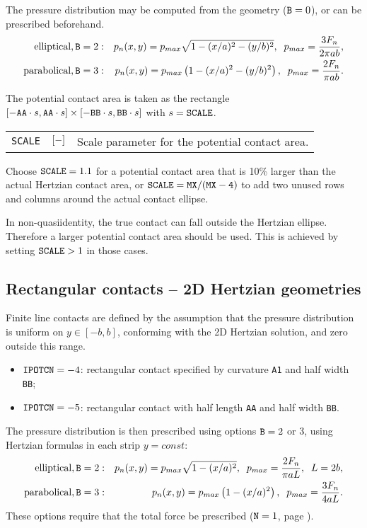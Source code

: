\documentclass[12pt]{report}
\newenvironment{inputvars}{\vspace{0.4\baselineskip}%

\begin{tabular}{>{\raggedright}p{22mm}p{19mm}p{113mm}}}{
\end{tabular}

}
\newcommand{\inpvar}[3]{{\small\tt #1} & $#2$ & #3 \\[1ex]}
\begin{document}
The pressure distribution may be computed from the geometry (${\tt B}=0$),
or can be prescribed beforehand.
\begin{eqnarray}
 \mbox{elliptical}, {\tt B}=2  &:& 
                p_n(x,y) = p_{max} \sqrt{ 1 - (x/a)^2 - (y/b)^2 },
        \;\; p_{max} = \frac{3F_n}{2\pi ab}, \\
 \mbox{parabolical}, {\tt B}=3 &:& 
                p_n(x,y) = p_{max} \left( 1 - (x/a)^2 - (y/b)^2 \right),
        \;\; p_{max} = \frac{2F_n}{\pi ab} .
\end{eqnarray}

The potential contact area is taken as the rectangle $[-{\tt AA}\cdot s,{\tt
AA}\cdot s] \times [-{\tt BB}\cdot s,{\tt BB}\cdot s]$ with $s={\tt
SCALE}$. 
\begin{inputvars}
\inpvar{SCALE}{\bunit{-}}{Scale parameter for the potential contact area.}
\end{inputvars}
Choose ${\tt SCALE}=1.1$ for a potential contact area that is 10\%
larger than the actual Hertzian contact area, or ${\tt SCALE}={\tt MX}/({\tt
MX-4})$ to add two unused rows and columns around the actual contact
ellipse.

In non-quasiidentity, the true contact can fall outside the Hertzian ellipse.
Therefore a larger potential contact area should be used. This is achieved by
setting ${\tt SCALE}>1$ in those cases.

\subsection{Rectangular contacts -- 2D Hertzian geometries}
\label{sec:hertz2d}

Finite line contacts are defined by the assumption that the pressure
distribution is uniform on $y\in[-b,b]$, conforming with the
2D Hertzian solution, and zero outside this range.
\begin{itemize}
\item ${\tt IPOTCN}=-4$: rectangular contact specified by curvature
        {\tt A1} and half width {\tt BB};
\item ${\tt IPOTCN}=-5$: rectangular contact with half length {\tt AA} and
        half width {\tt BB}.
\end{itemize}
The pressure distribution is then prescribed using options ${\tt B}=2$ or 3,
using Hertzian formulas in each strip $y=const$:
\begin{eqnarray}
 \mbox{elliptical}, {\tt B}=2  &:& 
                p_n(x,y) = p_{max} \sqrt{ 1 - (x/a)^2 },
        \;\; p_{max} = \frac{2F_n}{\pi aL}, \;\; L=2b, \\
 \mbox{parabolical}, {\tt B}=3 &:& 
                p_n(x,y) = p_{max} \left( 1 - (x/a)^2 \right),
        \;\; p_{max} = \frac{3F_n}{4aL} .
\end{eqnarray}
These options require that the total force be prescribed (${\tt N}=1$,
page \pageref{n3-digit}).
\end{document}

